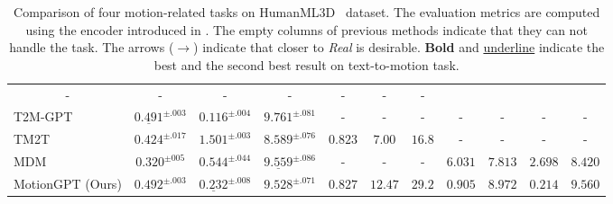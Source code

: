 \begin{table}[t]
{\begin{tabular}{@{}lcccccccccc@{}}
  \multicolumn{1}{c}{-}& \multicolumn{1}{c}{-}& \multicolumn{1}{c}{-}& \multicolumn{1}{c}{-}& \multicolumn{1}{c}{-}& \multicolumn{1}{c}{-} &
  \multicolumn{1}{c}{-}
  \\
T2M-GPT \cite{mdm2022human}&
   $\underline{0.491}^{\pm.003}$&
  $\boldsymbol{0.116}^{\pm.004}$ &
  $9.761^{\pm.081}$ &
  \multicolumn{1}{c}{-}& \multicolumn{1}{c}{-}& \multicolumn{1}{c}{-} & \multicolumn{1}{c}{-}& \multicolumn{1}{c}{-} & \multicolumn{1}{c}{-}& \multicolumn{1}{c}{-}
  \\
TM2T \cite{chuan2022tm2t} &
 $0.424^{\pm.017}$ &
  ${1.501^{\pm.003}}$ &
  $8.589^{\pm.076}$ &
  $0.823$&
  ${7.00}$ & 
  ${16.8}$& \multicolumn{1}{c}{-}& \multicolumn{1}{c}{-}& \multicolumn{1}{c}{-}& \multicolumn{1}{c}{-}
  \\
MDM \cite{mdm2022human}&
 $0.320^{\pm005}$ &
${0.544}^{\pm.044}$ &
  $\underline{9.559}^{\pm.086}$ &
  \multicolumn{1}{c}{-}& \multicolumn{1}{c}{-}& \multicolumn{1}{c}{-}& $6.031$ & $7.813$& $2.698 $&$ 8.420$
  \\
 \midrule
MotionGPT (Ours) &
$\boldsymbol{0.492}^{\pm.003}$ &
$\underline{0.232}^{\pm.008}$ & 
$\boldsymbol{9.528}^{\pm.071}$ &
$\boldsymbol{0.827}$
& $\boldsymbol{12.47}$ & $\boldsymbol{29.2}$ & $\boldsymbol{0.905}$ &$\boldsymbol{8.972}$  & $\boldsymbol{0.214}$&$\boldsymbol{9.560}$
   \\ \bottomrule
\end{tabular}%
}
\caption{Comparison of four motion-related tasks on HumanML3D~\cite{Guo_2022_CVPR_humanml3d} dataset. The evaluation metrics are computed using the encoder introduced in \cite{Guo_2022_CVPR_humanml3d}. The empty columns of previous methods indicate that they can not handle the task. The arrows ($\rightarrow$) indicate that closer to \textit{Real} is desirable. \textbf{Bold} and \underline{underline} indicate the best and the second best result on text-to-motion task.}
\label{tab:uniform}
\end{table}


